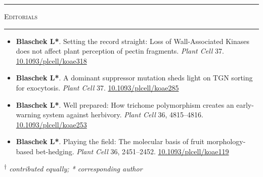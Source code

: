 \documentclass[11pt]{article}
\newcommand*{\xdash}[1][3em]{\rule[0.5ex]{#1}{0.55pt}}
\begin{document}
\hspace*{\fill} \xdash[6em] \large{\textsc{Editorials}} \xdash[6em] \hspace*{\fill}\normalsize

\vspace{-0.175cm}	
\begin{itemize}[label={},itemindent=-9pt,leftmargin=24pt]
	\itemsep-0.1cm
	\item \textbf{Blaschek L*}. Setting the record straight: Loss of Wall-Associated Kinases does not affect plant perception of pectin fragments. \textit{Plant Cell} 37. \href{https://doi.org/10.1093/plcell/koae318}{10.1093/plcell/koae318}
	\item \textbf{Blaschek L*}. A dominant suppressor mutation sheds light on TGN sorting for exocytosis. \textit{Plant Cell} 37. \href{https://doi.org/10.1093/plcell/koae285}{10.1093/plcell/koae285}
	\item \textbf{Blaschek L*}. Well prepared: How trichome polymorphism creates an early-warning system against herbivory. \textit{Plant Cell} 36, 4815--4816. \href{https://doi.org/10.1093/plcell/koae253}{10.1093/plcell/koae253}
	\item \textbf{Blaschek L*}. Playing the field: The molecular basis of fruit morphology-based bet-hedging. \textit{Plant Cell} 36, 2451--2452. \href{https://doi.org/10.1093/plcell/koae119}{10.1093/plcell/koae119}
\end{itemize}

\textit{\textsuperscript{$\dagger$} contributed equally; * corresponding author}
\vspace{0.5cm}

\end{document}
